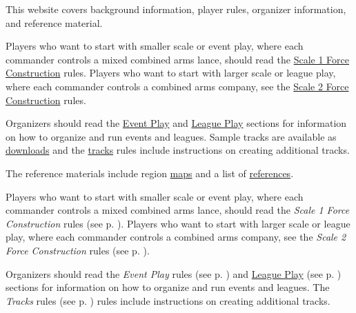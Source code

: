  {
This website covers background information, player rules, organizer information, and reference material.

Players who want to start with smaller scale or event play, where each commander controls a mixed combined arms lance, should read the \hyperref[subsec:force_construction_scale_1]{Scale 1 Force Construction} rules.
Players who want to start with larger scale or league play, where each commander controls a combined arms company, see the \hyperref[subsec:force_construction_scale_2]{Scale 2 Force Construction} rules.

Organizers should read the \hyperref[sec:event_play]{Event Play} and \hyperref[sec:league_play]{League Play} sections for information on how to organize and run events and leagues.
Sample tracks are available as \hyperref[sec:downloads]{downloads} and the \hyperref[sec:tracks]{tracks} rules include instructions on creating additional tracks.

The reference materials include region \hyperref[sec:outworlds_wastes_map]{maps} and a list of \hyperref[sec:references]{references}.
} {
Players who want to start with smaller scale or event play, where each commander controls a mixed combined arms lance, should read the \emph{Scale 1 Force Construction} rules (see p. \pageref{subsec:force_construction_scale_1}).
Players who want to start with larger scale or league play, where each commander controls a combined arms company, see the \emph{Scale 2 Force Construction} rules (see p. \pageref{subsec:force_construction_scale_2}).

Organizers should read the \emph{Event Play} rules (see p. \pageref{sec:event_play}) and \hyperref[sec:league_play]{League Play} (see p. \pageref{sec:league_play}) sections for information on how to organize and run events and leagues.
The \emph{Tracks} rules (see p. \pageref{sec:tracks}) rules include instructions on creating additional tracks.
}
